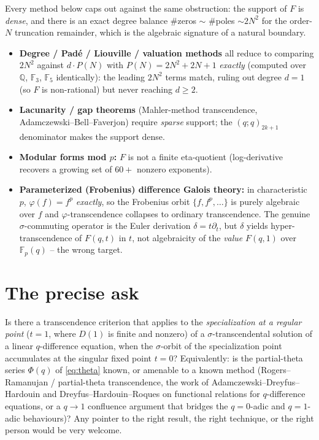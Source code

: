 \documentclass[11pt]{article}
\newcommand{\Q}{\mathbb{Q}}
\newcommand{\F}{\mathbb{F}}
\begin{document}
Every method below caps out against the same obstruction: the support of $F$ is \emph{dense}, and there
is an exact degree balance \#zeros $\sim$ \#poles $\sim 2N^2$ for the order-$N$ truncation remainder,
which is the algebraic signature of a natural boundary.
\begin{itemize}
\item \textbf{Degree / Pad\'e / Liouville / valuation methods} all reduce to comparing $2N^2$ against
$d\cdot P(N)$ with $P(N)=2N^2+2N+1$ \emph{exactly} (computed over $\Q$, $\F_3$, $\F_5$ identically):
the leading $2N^2$ terms match, ruling out degree $d=1$ (so $F$ is non-rational) but never reaching
$d\ge2$.
\item \textbf{Lacunarity / gap theorems} (Mahler-method transcendence, Adamczewski--Bell--Faverjon)
require \emph{sparse} support; the $(q;q)_{2k+1}$ denominator makes the support dense.
\item \textbf{Modular forms mod $p$:} $F$ is not a finite eta-quotient (log-derivative recovers a
growing set of $60+$ nonzero exponents).
\item \textbf{Parameterized (Frobenius) difference Galois theory:} in characteristic $p$,
$\varphi(f)=f^p$ \emph{exactly}, so the Frobenius orbit $\{f,f^p,\dots\}$ is purely algebraic over $f$
and $\varphi$-transcendence collapses to ordinary transcendence. The genuine $\sigma$-commuting
operator is the Euler derivation $\delta=t\partial_t$, but $\delta$ yields hyper-transcendence of
$F(q,t)$ in $t$, not algebraicity of the \emph{value} $F(q,1)$ over $\F_p(q)$ -- the wrong target.
\end{itemize}

\section*{The precise ask}

Is there a transcendence criterion that applies to the \emph{specialization at a regular point} ($t=1$,
where $D(1)$ is finite and nonzero) of a $\sigma$-transcendental solution of a linear $q$-difference
equation, when the $\sigma$-orbit of the specialization point accumulates at the singular fixed point
$t=0$? Equivalently: is the partial-theta series $\Phi(q)$ of \eqref{eq:theta} known, or amenable to a
known method (Rogers--Ramanujan / partial-theta transcendence, the work of Adamczewski--Dreyfus--Hardouin
and Dreyfus--Hardouin--Roques on functional relations for $q$-difference equations, or a $q\to1$
confluence argument that bridges the $q=0$-adic and $q=1$-adic behaviours)? Any pointer to the right
result, the right technique, or the right person would be very welcome.
\end{document}
